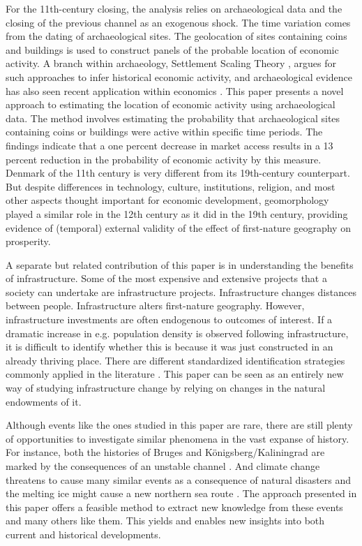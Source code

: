 \documentclass[11pt]{article}
\begin{document}
For the 11th-century closing, the analysis relies on archaeological data and the closing of the previous channel as an exogenous shock. The time variation comes from the dating of archaeological sites. The geolocation of sites containing coins and buildings is used to construct panels of the probable location of economic activity. A branch within archaeology, Settlement Scaling Theory \citep{Ortman2020}, argues for such approaches to infer historical economic activity, and archaeological evidence has also seen recent application within economics \citep{Davis2002, Barjamovic2019, Bakker2021Phonecians, Allen2023}. This paper presents a novel approach to estimating the location of economic activity using archaeological data. The method involves estimating the probability that archaeological sites containing coins or buildings were active within specific time periods. The findings indicate that a one percent decrease in market access results in a 13 percent reduction in the probability of economic activity by this measure. Denmark of the 11th century is very different from its 19th-century counterpart. But despite differences in technology, culture, institutions, religion, and most other aspects thought important for economic development, geomorphology played a similar role in the 12th century as it did in the 19th century, providing evidence of (temporal) external validity of the effect of first-nature geography on prosperity.

A separate but related contribution of this paper is in understanding the benefits of infrastructure. Some of the most expensive and extensive projects that a society can undertake are infrastructure projects. Infrastructure changes distances between people. Infrastructure alters first-nature geography. However, infrastructure investments are often endogenous to outcomes of interest.  If a dramatic increase in e.g. population density is observed following infrastructure, it is difficult to identify whether this is because it was just constructed in an already thriving place. There are different standardized identification strategies commonly applied in the literature \citep{Redding2015}. This paper can be seen as an entirely new way of studying infrastructure change by relying on changes in the natural endowments of it.

Although events like the ones studied in this paper are rare, there are still plenty of opportunities to investigate similar phenomena in the vast expanse of history. For instance, both the histories of Bruges and Königsberg/Kaliningrad are marked by the consequences of an unstable channel \citep{Houtte1966, Charlier2011, Britannica2018}. And climate change threatens to cause many similar events as a consequence of natural disasters \citep{IPCC2022} and the melting ice might cause a new northern sea route \citep{Bekker2018NothernSeaRoute}. The approach presented in this paper offers a feasible method to extract new knowledge from these events and many others like them. This yields and enables new insights into both current and historical developments. 
\end{document}
